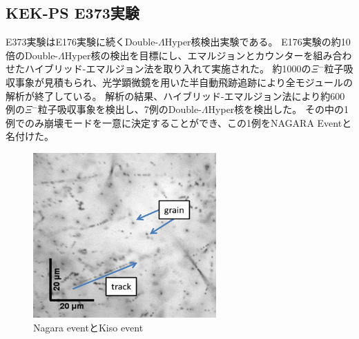 \documentclass[12pt,a4paper]{jarticle}
\begin{document}
\subsection{KEK-PS E373実験}
E373実験はE176実験に続くDouble-$\Lambda$Hyper核検出実験である。
\cite{Nagara}
\cite{Nagara2}
E176実験の約10倍のDouble-$\Lambda$Hyper核の検出を目標にし、エマルジョンとカウンターを組み合わせたハイブリッド-エマルジョン法を取り入れて実施された。
約1000の$\Xi$$^-$粒子吸収事象が見積もられ、光学顕微鏡を用いた半自動飛跡追跡により全モジュールの解析が終了している。
解析の結果、ハイブリッド-エマルジョン法により約600例の$\Xi$$^-$粒子吸収事象を検出し、7例のDouble-$\Lambda$Hyper核を検出した。
その中の1例でのみ崩壊モードを一意に決定することができ、この1例をNAGARA Eventと名付けた。
\begin{figure}[htbp]
  \centering
     \includegraphics[width=70mm]{grainfog.png}
  \caption{Nagara eventとKiso event\label{fig:Nagara_Kiso}}
\end{figure}
\end{document}
